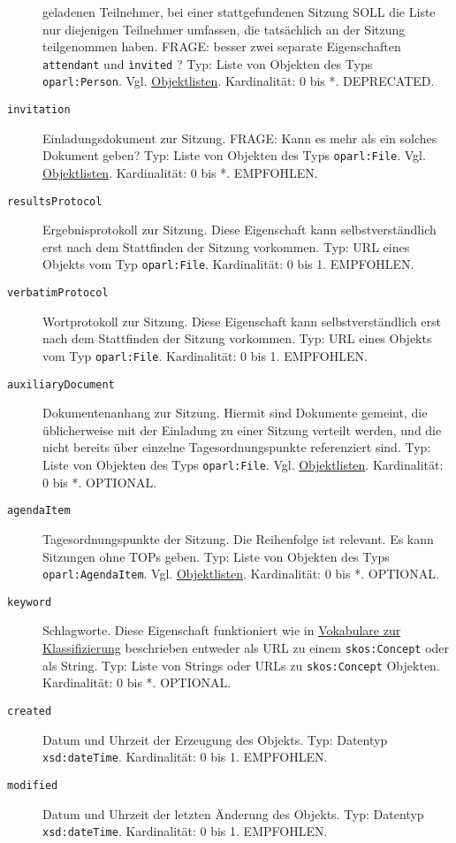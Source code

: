 \documentclass[,a4paper]{article}
\begin{document}
\begin{description}
geladenen Teilnehmer, bei einer stattgefundenen Sitzung SOLL die Liste
nur diejenigen Teilnehmer umfassen, die tatsächlich an der Sitzung
teilgenommen haben. FRAGE: besser zwei separate Eigenschaften
\texttt{attendant} und \texttt{ìnvited} ? Typ: Liste von Objekten des
Typs \texttt{oparl:Person}. Vgl. \hyperref[objektlisten]{Objektlisten}.
Kardinalität: 0 bis *. DEPRECATED.
\item[\texttt{invitation}]
Einladungsdokument zur Sitzung. FRAGE: Kann es mehr als ein solches
Dokument geben? Typ: Liste von Objekten des Typs \texttt{oparl:File}.
Vgl. \hyperref[objektlisten]{Objektlisten}. Kardinalität: 0 bis *.
EMPFOHLEN.
\item[\texttt{resultsProtocol}]
Ergebnisprotokoll zur Sitzung. Diese Eigenschaft kann selbstverständlich
erst nach dem Stattfinden der Sitzung vorkommen. Typ: URL eines Objekts
vom Typ \texttt{oparl:File}. Kardinalität: 0 bis 1. EMPFOHLEN.
\item[\texttt{verbatimProtocol}]
Wortprotokoll zur Sitzung. Diese Eigenschaft kann selbstverständlich
erst nach dem Stattfinden der Sitzung vorkommen. Typ: URL eines Objekts
vom Typ \texttt{oparl:File}. Kardinalität: 0 bis 1. EMPFOHLEN.
\item[\texttt{auxiliaryDocument}]
Dokumentenanhang zur Sitzung. Hiermit sind Dokumente gemeint, die
üblicherweise mit der Einladung zu einer Sitzung verteilt werden, und
die nicht bereits über einzelne Tagesordnungspunkte referenziert sind.
Typ: Liste von Objekten des Typs \texttt{oparl:File}. Vgl.
\hyperref[objektlisten]{Objektlisten}. Kardinalität: 0 bis *. OPTIONAL.
\item[\texttt{agendaItem}]
Tagesordnungspunkte der Sitzung. Die Reihenfolge ist relevant. Es kann
Sitzungen ohne TOPs geben. Typ: Liste von Objekten des Typs
\texttt{oparl:AgendaItem}. Vgl. \hyperref[objektlisten]{Objektlisten}.
Kardinalität: 0 bis *. OPTIONAL.
\item[\texttt{keyword}]
Schlagworte. Diese Eigenschaft funktioniert wie in
\hyperref[vokabulareux5fklassifizierung]{Vokabulare zur Klassifizierung}
beschrieben entweder als URL zu einem \texttt{skos:Concept} oder als
String. Typ: Liste von Strings oder URLs zu \texttt{skos:Concept}
Objekten. Kardinalität: 0 bis *. OPTIONAL.
\item[\texttt{created}]
Datum und Uhrzeit der Erzeugung des Objekts. Typ: Datentyp
\texttt{xsd:dateTime}. Kardinalität: 0 bis 1. EMPFOHLEN.
\item[\texttt{modified}]
Datum und Uhrzeit der letzten Änderung des Objekts. Typ: Datentyp
\texttt{xsd:dateTime}. Kardinalität: 0 bis 1. EMPFOHLEN.
\end{description}
\end{document}
